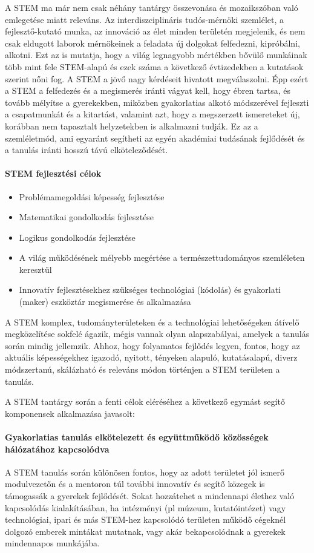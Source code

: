 A STEM ma már nem csak néhány tantárgy összevonása és  mozaikszóban való
emlegetése miatt releváns. Az interdiszciplináris tudós-mérnöki szemlélet, a
fejlesztő-kutató munka, az innováció az élet minden területén megjelenik, és
nem csak eldugott laborok mérnökeinek a feladata új dolgokat felfedezni,
kipróbálni, alkotni. Ezt az is mutatja, hogy a világ legnagyobb mértékben
bővülő munkáinak több mint fele STEM-alapú és ezek száma a következő
évtizedekben a kutatások szerint nőni fog. A STEM a jövő nagy kérdéseit
hivatott megválaszolni. Épp ezért a STEM a felfedezés és a megismerés iránti
vágyat kell, hogy ébren tartsa, és tovább mélyítse a gyerekekben, miközben
gyakorlatias alkotó módszerével fejleszti a csapatmunkát és a kitartást,
valamint azt, hogy a megszerzett ismereteket új, korábban nem tapasztalt
helyzetekben is alkalmazni tudják. Ez az a szemléletmód, ami egyaránt segítheti
az egyén akadémiai tudásának fejlődését és a tanulás iránti hosszú távú
elköteleződését.

\paragraph{STEM fejlesztési célok}
\begin{itemize}
  \item Problémamegoldási képesség fejlesztése
  \item  Matematikai gondolkodás fejlesztése
  \item  Logikus gondolkodás fejlesztése
  \item  A világ működésének mélyebb megértése a természettudományos szemléleten
        keresztül
  \item  Innovatív fejlesztésekhez szükséges technológiai (kódolás) és gyakorlati
        (maker) eszköztár megismerése és alkalmazása
\end{itemize}

A STEM komplex, tudományterületeken és a technológiai lehetőségeken átívelő
megközelítése sokfelé ágazik, mégis vannak olyan alapszabályai, amelyek a
tanulás során mindig jellemzik. Ahhoz, hogy folyamatos fejlődés legyen, fontos,
hogy az aktuális képességekhez igazodó, nyitott, tényeken alapuló, kutatásalapú, diverz módszertanú, skálázható és releváns módon történjen a STEM
területen a tanulás.

A STEM tantárgy során a fenti célok eléréséhez a következő egymást segítő
komponensek alkalmazása javasolt:

\paragraph{Gyakorlatias tanulás elkötelezett és együttműködő közösségek
  hálózatához kapcsolódva}
A STEM tanulás során különösen fontos, hogy az adott területet jól ismerő
modulvezetőn és a mentoron túl további innovatív és segítő közegek is támogassák a
gyerekek fejlődését. Sokat hozzátehet a mindennapi élethez való kapcsolódás
kialakításában, ha intézményi (pl múzeum, kutatóintézet) vagy technológiai,
ipari és más STEM-hez kapcsolódó területen működő cégeknél dolgozó emberek
mintákat mutatnak, vagy akár bekapcsolódnak a gyerekek mindennapos munkájába.

